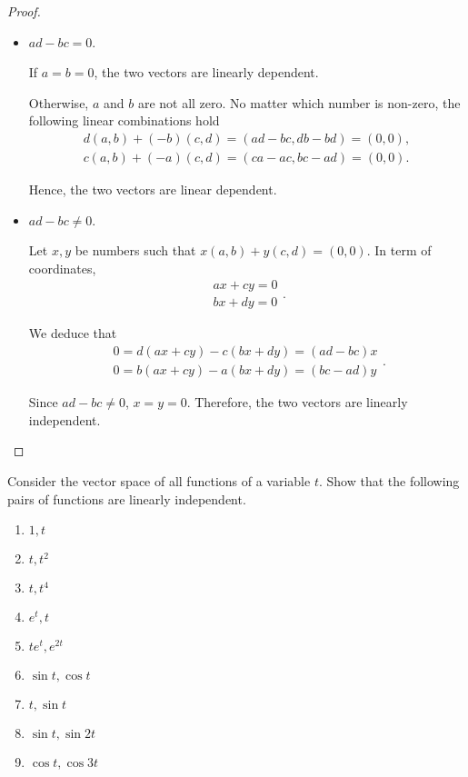 \begin{proof}
    \begin{itemize}
        \item $ad - bc = 0$.

              If $a = b = 0$, the two vectors are linearly dependent.

              Otherwise, $a$ and $b$ are not all zero. No matter which number is non-zero, the following linear combinations hold
              \[
                  \begin{split}
                      d(a, b) + (-b)(c, d) = (ad - bc, db - bd) = (0, 0), \\
                      c(a, b) + (-a)(c, d) = (ca - ac, bc - ad) = (0, 0).
                  \end{split}
              \]

              Hence, the two vectors are linear dependent.
        \item $ad - bc\ne 0$.

              Let $x, y$ be numbers such that $x(a, b) + y(c, d) = (0, 0)$. In term of coordinates,
              \[
                  \begin{split}
                      ax + cy = 0 \\
                      bx + dy = 0
                  \end{split}.
              \]

              We deduce that
              \[
                  \begin{split}
                      0 = d(ax + cy) - c(bx + dy) = (ad - bc)x \\
                      0 = b(ax + cy) - a(bx + dy) = (bc - ad)y
                  \end{split}.
              \]

              Since $ad - bc\ne 0$, $x = y = 0$. Therefore, the two vectors are linearly independent.
    \end{itemize}
\end{proof}

\begin{exercise}
    Consider the vector space of all functions of a variable $t$. Show that the following pairs of functions are linearly independent.
    \begin{enumerate}[label={(\alph*)},itemsep=0pt]
        \item $1, t$
        \item $t, t^{2}$
        \item $t, t^{4}$
        \item $e^{t}, t$
        \item $t{e}^{t}, e^{2t}$
        \item $\sin t, \cos t$
        \item $t, \sin t$
        \item $\sin t, \sin 2t$
        \item $\cos t, \cos 3t$
    \end{enumerate}
\end{exercise}

